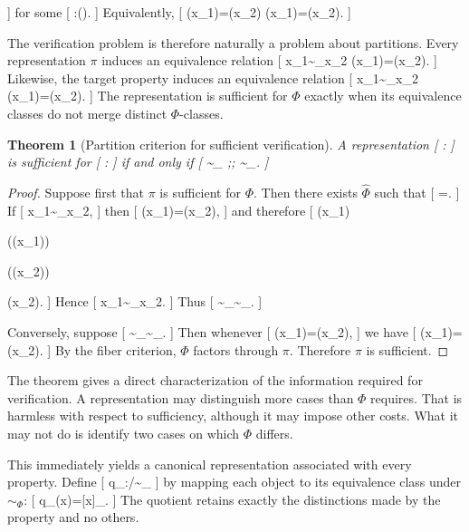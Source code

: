\documentclass[11pt]{article}
\newtheorem{theorem}{Theorem} \newtheorem{proposition}{Proposition} \newtheorem{lemma}{Lemma} \newtheorem{corollary}{Corollary} \newtheorem{definition}{Definition} \newtheorem{remark}{Remark}
\begin{document}
\widehat{\Phi}\circ\pi
]
for some
[
\widehat{\Phi}:\Img(\pi)\rightarrow{}.
]
Equivalently,
[
\pi(x_1)=\pi(x_2)
\Longrightarrow
\Phi(x_1)=\Phi(x_2).
]

The verification problem is therefore naturally a problem about partitions. Every representation $\pi$ induces an equivalence relation
[
x_1\sim_\pi x_2
\quad\Longleftrightarrow\quad
\pi(x_1)=\pi(x_2).
]
Likewise, the target property induces an equivalence relation
[
x_1\sim_\Phi x_2
\quad\Longleftrightarrow\quad
\Phi(x_1)=\Phi(x_2).
]
The representation is sufficient for $\Phi$ exactly when its equivalence classes do not merge distinct $\Phi$-classes.

\begin{theorem}[Partition criterion for sufficient verification]
A representation
[
\pi:\rightarrow{}
]
is sufficient for
[
\Phi:\rightarrow{}
]
if and only if
[
\sim_\pi
;\subseteq;
\sim_\Phi.
]
\end{theorem}

\begin{proof}
Suppose first that $\pi$ is sufficient for $\Phi$. Then there exists $\widehat{\Phi}$ such that
[
\Phi=\widehat{\Phi}\circ\pi.
]
If
[
x_1\sim_\pi x_2,
]
then
[
\pi(x_1)=\pi(x_2),
]
and therefore
[
\Phi(x_1)

\widehat{\Phi}(\pi(x_1))

\widehat{\Phi}(\pi(x_2))

\Phi(x_2).
]
Hence
[
x_1\sim_\Phi x_2.
]
Thus
[
\sim_\pi\subseteq\sim_\Phi.
]

Conversely, suppose
[
\sim_\pi\subseteq\sim_\Phi.
]
Then whenever
[
\pi(x_1)=\pi(x_2),
]
we have
[
\Phi(x_1)=\Phi(x_2).
]
By the fiber criterion, $\Phi$ factors through $\pi$. Therefore $\pi$ is sufficient.
\end{proof}

The theorem gives a direct characterization of the information required for verification. A representation may distinguish more cases than $\Phi$ requires. That is harmless with respect to sufficiency, although it may impose other costs. What it may not do is identify two cases on which $\Phi$ differs.

This immediately yields a canonical representation associated with every property. Define
[
q_\Phi:\rightarrow{}/{\sim_\Phi}
]
by mapping each object to its equivalence class under $\sim_\Phi$:
[
q_\Phi(x)=[x]_\Phi.
]
The quotient retains exactly the distinctions made by the property and no others.
\end{document}
